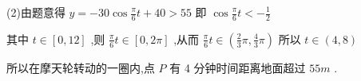 \documentclass[10pt]{article}
\begin{document}
(2)由题意得 \(y =  - {30}\cos \frac{\pi }{6}t + {40} > {55}\) 即 \(\cos \frac{\pi }{6}t <  - \frac{1}{2}\)

其中 \(t \in  \left\lbrack  {0,{12}}\right\rbrack\) ,则 \(\frac{\pi }{6}t \in  \left\lbrack  {0,{2\pi }}\right\rbrack\) ,从而 \(\frac{\pi }{6}t \in  \left( {\frac{2}{3}\pi ,\frac{4}{3}\pi }\right)\) 所以 \(t \in  \left( {4,8}\right)\)

所以在摩天轮转动的一圈内,点 \(P\) 有 4 分钟时间距离地面超过 \({55m}\) .
\end{document}
